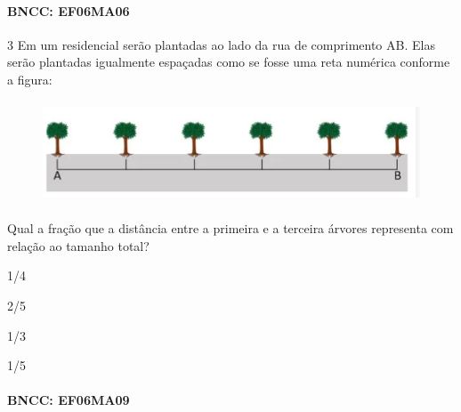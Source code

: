 \paragraph{BNCC: EF06MA06}


\num{3}  Em um residencial serão plantadas ao lado da rua de comprimento AB.
Elas serão plantadas igualmente espaçadas como se fosse uma reta
numérica conforme a figura:


\begin{figure}
\includegraphics[width=5in,height=1.19792in]{./imgSAEB_6_MAT/media/image109.png}
\end{figure}

Qual a fração que a distância entre a primeira e a terceira árvores
representa com relação ao tamanho total?

\begin{escolha}
\item 1/4
\item 2/5
\item 1/3
\item 1/5
\end{escolha}

\paragraph{BNCC: EF06MA09}


